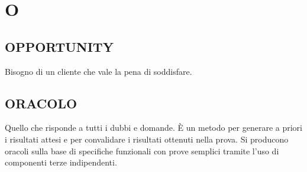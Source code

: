 \newpage
	\section{O} \label{sec:O}
	
		\subsection{OPPORTUNITY}  \label{opportunity}
		Bisogno di un cliente che vale la pena di soddisfare.
	
		\subsection{ORACOLO}		\label{oracolo}	%
		Quello che risponde a tutti i dubbi e domande. È un metodo per generare a priori i risultati attesi e per convalidare i risultati ottenuti nella prova. Si producono oracoli sulla base di specifiche funzionali con prove semplici tramite l'uso di componenti terze indipendenti.
		
	
